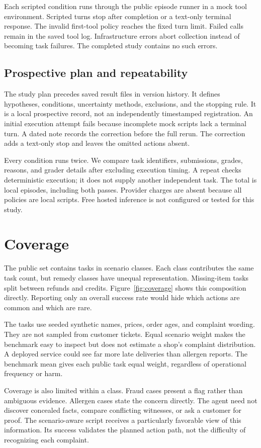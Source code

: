 \documentclass{article}
\begin{document}
Each scripted condition runs through the public episode runner in a mock tool environment. Scripted turns stop after completion or a text-only terminal response. The invalid first-tool policy reaches the fixed turn limit. Failed calls remain in the saved tool log. Infrastructure errors abort collection instead of becoming task failures. The completed study contains no such errors.
\subsection{Prospective plan and repeatability}
The study plan precedes saved result files in version history. It defines hypotheses, conditions, uncertainty methods, exclusions, and the stopping rule. It is a local prospective record, not an independently timestamped registration. An initial execution attempt fails because incomplete mock scripts lack a terminal turn. A dated note records the correction before the full rerun. The correction adds a text-only stop and leaves the omitted actions absent.

Every condition runs twice. We compare task identifiers, submissions, grades, reasons, and grader details after excluding execution timing. A repeat checks deterministic execution; it does not supply another independent task. The total is \episodeCount{} local episodes, including both passes. Provider charges are absent because all policies are local scripts. Free hosted inference is not configured or tested for this study.
\section{Coverage}
The public set contains \taskCount{} tasks in \scenarioCount{} scenario classes. Each class contributes the same task count, but remedy classes have unequal representation. Missing-item tasks split between refunds and credits. Figure~\ref{fig:coverage} shows this composition directly. Reporting only an overall success rate would hide which actions are common and which are rare.
\coverageFigure

The tasks use seeded synthetic names, prices, order ages, and complaint wording. They are not sampled from customer tickets. Equal scenario weight makes the benchmark easy to inspect but does not estimate a shop's complaint distribution. A deployed service could see far more late deliveries than allergen reports. The benchmark mean gives each public task equal weight, regardless of operational frequency or harm.

Coverage is also limited within a class. Fraud cases present a flag rather than ambiguous evidence. Allergen cases state the concern directly. The agent need not discover concealed facts, compare conflicting witnesses, or ask a customer for proof. The scenario-aware script receives a particularly favorable view of this information. Its success validates the planned action path, not the difficulty of recognizing each complaint.
\end{document}
